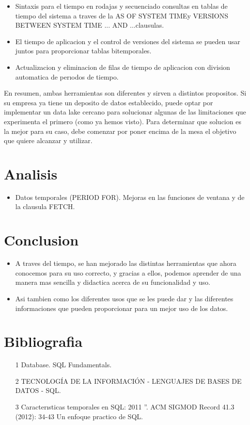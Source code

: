 \documentclass[preprint,12pt]{elsarticle}
\begin{document}
\begin{itemize}
\item Sintaxis para el tiempo en rodajas y secuenciado consultas en tablas de tiempo del sistema a traves de la AS OF SYSTEM TIMEy VERSIONS BETWEEN SYSTEM TIME ... AND ...clausulas.

\item El tiempo de aplicacion y el control de versiones del sistema se pueden usar juntos para proporcionar tablas bitemporales.

\item Actualizacion y eliminacion de filas de tiempo de aplicacion con division automatica de perıodos de tiempo.
\end{itemize}


En resumen, ambas herramientas son diferentes y sirven a distintos propositos.  Si  su  empresa  ya  tiene  un  deposito  de  datos  establecido, puede optar por implementar un data lake cercano para solucionar algunas de las limitaciones que experimenta el primero (como ya hemos visto).  Para  determinar  que  solucion  es  la  mejor  para  su  caso,  debe comenzar por poner encima de la mesa el objetivo que quiere alcanzar y utilizar.

\section{Analisis}
\begin{itemize}
\subsection{SQL:2011 is the ISO/IEC 9075:2011 standard of 2011}

\item Datos temporales (PERIOD FOR). Mejoras en las funciones de ventana y de la clausula FETCH.
\end{itemize}

\section{Conclusion}

\begin{itemize}
\item A traves del tiempo, se han mejorado las distintas herramientas que ahora conocemos para su uso correcto, y gracias a ellos, podemos aprender de una manera mas sencilla y didactica acerca de su funcionalidad y uso.
\item Asi tambien como los diferentes usos que se les puede dar y las diferentes informaciones que pueden proporcionar para un mejor uso de los datos.

\end{itemize}

\section{Bibliografia}

\begin{itemize}
\item[1]	Database. SQL Fundamentals.
\item[2]    TECNOLOGÍA DE LA INFORMACIÓN - LENGUAJES DE BASES DE DATOS - SQL.
\item[3]	Caracterısticas temporales en SQL: 2011 ”. ACM SIGMOD Record 41.3 (2012): 34-43 Un enfoque practico de SQL.

\end{itemize}
\end{document}
